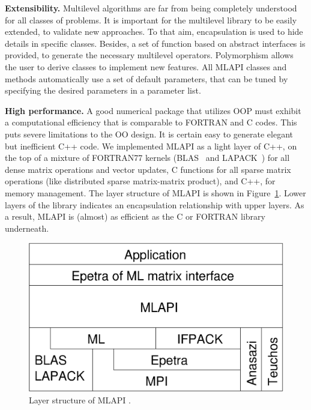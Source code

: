 \documentclass{article}[11pt]
\newcommand{\MLAPI}  {{\sc MLAPI }}
\begin{document}
\noindent
{\bf Extensibility.} Multilevel algorithms are far from being completely
understood for all classes of problems. It is important for the multilevel
library to be easily extended, to validate new approaches. To that aim,
encapsulation is used to hide details in
specific classes. Besides, a set of function based on abstract interfaces
is provided, to generate the necessary multilevel operators. Polymorphism
allows the user to derive classes to implement new features.
All \MLAPI classes and methods automatically use a set of
default parameters, that can be tuned by specifying the
desired parameters in a parameter list.

\bigskip

\noindent
{\bf High performance.} A good numerical package that utilizes
OOP must exhibit a computational efficiency that is comparable to FORTRAN and
C codes. This puts severe limitations to the OO design. It is certain easy to
generate elegant but inefficient C++ code. 
We implemented \MLAPI as a light layer of
C++, on the top of
a mixture of FORTRAN77 kernels (BLAS~\cite{dongarra90set} and
                                LAPACK~\cite{demmel89lapack}) 
for all dense matrix
operations and vector updates, C functions for all sparse matrix operations
(like distributed sparse matrix-matrix product), and C++, for memory
management. The layer
structure of \MLAPI is shown in Figure~\ref{fig:layer}. Lower layers of the
library indicates an encapsulation relationship with upper layers. As a
result, \MLAPI is (almost) as
efficient as the C or FORTRAN library underneath.

\begin{figure}
\begin{center}
\includegraphics[width=12cm]{layer.eps}
\caption{Layer structure of \MLAPI.}
\label{fig:layer}
\end{center}
\end{figure}
\end{document}
